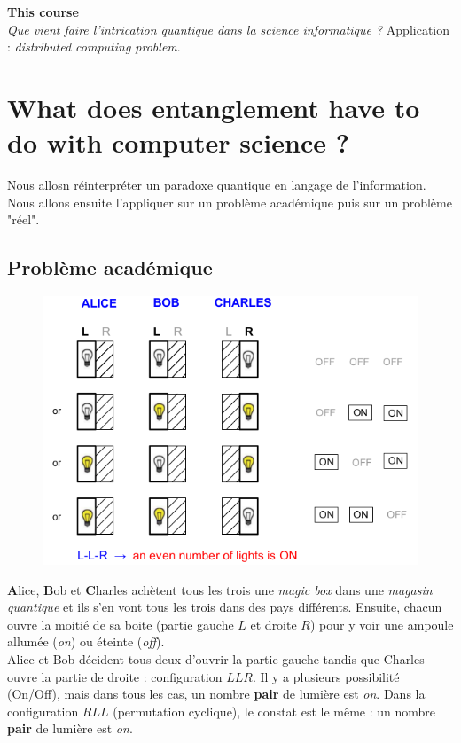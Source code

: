 \textbf{This course}\\
\textit{Que vient faire l'intrication quantique dans la science informatique ? } Application : 
\textit{distributed computing problem}.




\section{What does entanglement have to do with computer science ?}
Nous allosn réinterpréter un paradoxe quantique en langage de l'information. Nous allons ensuite
l'appliquer sur un problème académique puis sur un problème "réel". 

\subsection{Problème académique}
	\begin{figure}
	\vspace{-5mm}
	\includegraphics[scale=0.3]{ch2/image5}
	\end{figure}
\textbf{A}lice, \textbf{B}ob et \textbf{C}harles achètent tous les trois une \textit{magic box} 
dans une \textit{magasin quantique} et ils s'en vont tous les trois dans des pays différents. Ensuite,
chacun ouvre la moitié de sa boite (partie gauche $L$ et droite $R$) pour y voir une ampoule
allumée (\textit{on}) ou éteinte (\textit{off}).\\

Alice et Bob décident tous deux d'ouvrir la partie gauche tandis que Charles ouvre la partie de 
droite : configuration $LLR$. Il y a plusieurs possibilité (On/Off), mais dans tous les cas, un
nombre \textbf{pair} de lumière est \textit{on}. Dans la configuration $RLL$ (permutation cyclique),
le constat est le même : un nombre \textbf{pair} de lumière est \textit{on}.\\

